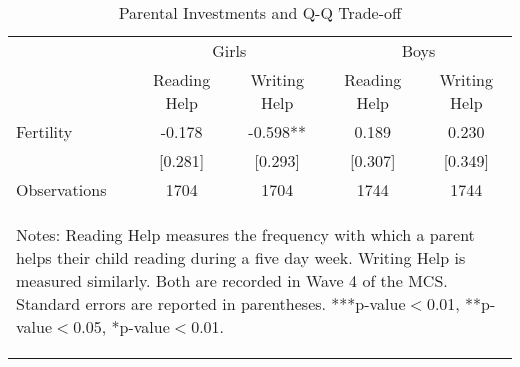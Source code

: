 \begin{table}[htbp]\centering
\def\sym#1{\ifmmode^{#1}\else\(^{#1}\)\fi}
\caption{Parental Investments and Q-Q Trade-off}
\begin{tabular}{l*{4}{c}}
\toprule
                    &\multicolumn{2}{c}{Girls}      &\multicolumn{2}{c}{Boys}       \\\cmidrule(lr){2-3}\cmidrule(lr){4-5}
                    &Reading Help   &Writing Help   &Reading Help   &Writing Help   \\
\midrule
Fertility           &      -0.178   &      -0.598** &       0.189   &       0.230   \\
                    &     [0.281]   &     [0.293]   &     [0.307]   &     [0.349]   \\
\midrule
Observations        &        1704   &        1704   &        1744   &        1744   \\
\bottomrule\multicolumn{5}{p{14.6cm}}{\begin{footnotesize}        
Notes: Reading Help measures the frequency with which a parent helps their child reading during a five day week. Writing Help is measured similarly. Both are recorded in Wave 4 of the MCS. Standard errors are reported in parentheses. ***p-value$<$0.01, **p-value$<$0.05, *p-value$<$0.01.                                
\end{footnotesize}}\end{tabular}\end{table}
